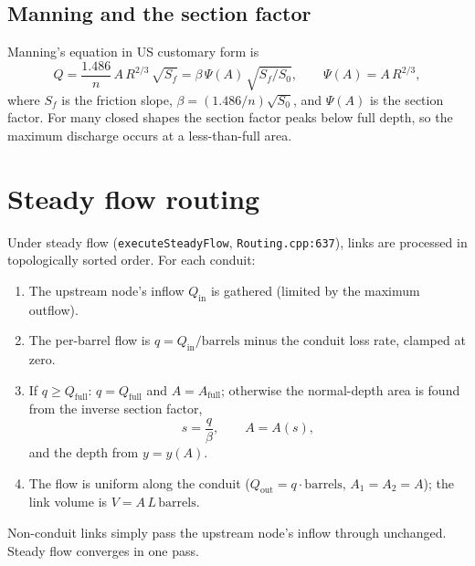 \documentclass[11pt,a4paper]{article}
\begin{document}
\subsection{Manning and the section factor}

Manning's equation in US customary form is
\begin{equation}
  Q = \frac{1.486}{n}\,A\,R^{2/3}\,\sqrt{S_f}
  = \beta\,\Psi(A)\,\sqrt{S_f/S_0},
  \qquad \Psi(A) = A\,R^{2/3},
\end{equation}
where $S_f$ is the friction slope, $\beta = (1.486/n)\sqrt{S_0}$, and
$\Psi(A)$ is the section factor. For many closed shapes the section factor
peaks below full depth, so the maximum discharge occurs at a less-than-full
area.

\section{Steady flow routing}

Under steady flow (\texttt{executeSteadyFlow}, \texttt{Routing.cpp:637}), links
are processed in topologically sorted order. For each conduit:
\begin{enumerate}[nosep]
  \item The upstream node's inflow $Q_{\mathrm{in}}$ is gathered (limited by
        the maximum outflow).
  \item The per-barrel flow is $q = Q_{\mathrm{in}}/\mathrm{barrels}$ minus
        the conduit loss rate, clamped at zero.
  \item If $q \ge Q_{\mathrm{full}}$: $q = Q_{\mathrm{full}}$ and
        $A = A_{\mathrm{full}}$; otherwise the normal-depth area is found from
        the inverse section factor,
        \begin{equation}
          s = \frac{q}{\beta}, \qquad A = A(s),
        \end{equation}
        and the depth from $y = y(A)$.
  \item The flow is uniform along the conduit ($Q_{\mathrm{out}} =
        q\cdot\mathrm{barrels}$, $A_1 = A_2 = A$); the link volume is
        $V = A\,L\,\mathrm{barrels}$.
\end{enumerate}
Non-conduit links simply pass the upstream node's inflow through unchanged.
Steady flow converges in one pass.

\end{document}
